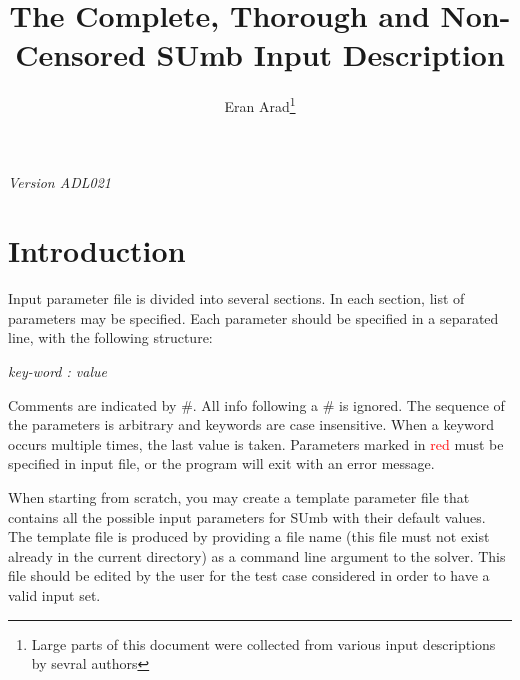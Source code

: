 \documentclass[12pt,epsf,colordvi]{article}
\begin{document}
\title{\bf The Complete, Thorough and Non-Censored SUmb Input Description  } 
\author{ Eran Arad\footnote{Large parts of this document were collected from various input descriptions by sevral authors} }
  \maketitle
\begin{center}
	{\it Version ADL021 } \\

\end{center}
%
\noindent 
\section{Introduction}
%
Input parameter file is divided into several sections.
In each section, list of parameters may be specified.
Each parameter should be specified in a separated line, with the following structure:
%
	\begin{center}{\it key-word   :  value} \end{center}
%
\noindent 
Comments are indicated by \#. All info following a \# is ignored.
 The sequence of the parameters is arbitrary and keywords are case insensitive.
 When a keyword occurs multiple times, the last value is taken.
Parameters marked in \textcolor{red}{red} must be specified in input file,
or the program will exit with an error message.

When starting from scratch, you may create a template parameter file that contains all  the possible input parameters for SUmb with their default values. The template file is produced by providing a file name  (this file must not exist already in the current directory) as a command line argument to the solver. This file should be edited by the user for the test case considered in order to have a valid input set. 

\parindent=0pt 

%
\noindent 
\end{document}
